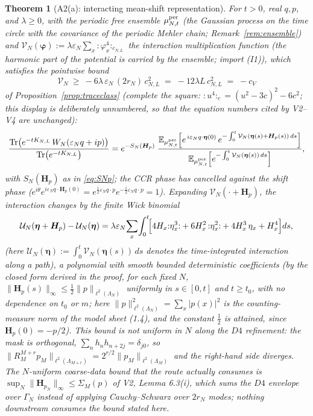 \documentclass[11pt,a4paper]{article}
\theoremstyle{plain}
\newtheorem{theorem}{Theorem}[section]
\theoremstyle{definition}
\newcommand{\E}{\mathbb{E}}
\newcommand{\eps}{\varepsilon}
\DeclareMathOperator{\Trace}{Tr}
\begin{document}
\begin{theorem}[A2(a): interacting mean-shift representation]\label{thm:meanshift}
For $t>0$, real $q,p$, and $\lambda\ge0$, with the periodic free ensemble
$\mu^{\rm per}_{N,t}$ (the Gaussian process on the time circle with the
covariance of the periodic Mehler chain; Remark~\ref{rem:ensemble}) and
$\mathcal V_N(\bm\varphi):=\lambda\eps_N\sum_x{:}\varphi_x^4{:}_{c_{N,L}}$
the \emph{interaction} multiplication function (the harmonic part of the
potential is carried by the ensemble; import (I1)), which satisfies the
pointwise bound
\[
 \mathcal V_N\ \ge\ -6\lambda\,\eps_N\,(2r_N)\,c_{N,L}^2
 \;=\;-12\lambda L\,c_{N,L}^2\;=\;-c_V
\]
of Proposition~\ref{prop:traceclass} (complete the square:
${:}u^4{:}_c=(u^2-3c)^2-6c^2$; this display is deliberately unnumbered, so
that the equation numbers cited by V2--V4 are unchanged):
\begin{equation}
 \frac{\Trace\bigl(e^{-tK_{N,L}}\,W_N(\eps_Nq+ip)\bigr)}
      {\Trace\bigl(e^{-tK_{N,L}}\bigr)}
 =e^{-S_N(\bm H_p)}\;
 \frac{\displaystyle\E_{\mu^{\rm per}_{N,t}}
 \Bigl[e^{\,i\eps_Nq\cdot\bm\eta(0)}\,
 e^{-\int_0^t\mathcal V_N(\bm\eta(s)+\bm H_p(s))\,ds}\Bigr]}
 {\displaystyle\E_{\mu^{\rm per}_{N,t}}
 \Bigl[e^{-\int_0^t\mathcal V_N(\bm\eta(s))\,ds}\Bigr]} ,
 \label{eq:meanshift}
\end{equation}
with $S_N(\bm H_p)$ as in \eqref{eq:SNp}; the CCR phase has cancelled against
the shift phase ($e^{i\theta}e^{i\eps_Nq\cdot\bm H_p(0)}
=e^{\frac i2\eps_Nq\cdot p}e^{-\frac i2\eps_Nq\cdot p}=1$). Expanding
$\mathcal V_N(\cdot+\bm H_p)$, the interaction changes by the finite Wick binomial
\begin{equation}
 \mathcal U_N(\bm\eta+\bm H_p)-\mathcal U_N(\bm\eta)
 =\lambda\eps_N\!\sum_x\!\int_0^t\!
 \Bigl[4H_x{:}\eta_x^3{:}+6H_x^2\,{:}\eta_x^2{:}
 +4H_x^3\,\eta_x+H_x^4\Bigr]ds,
 \label{eq:wickshift}
\end{equation}
(here $\mathcal U_N(\bm\eta):=\int_0^t\mathcal V_N(\bm\eta(s))\,ds$ denotes
the time-integrated interaction along a path), a polynomial with smooth
bounded deterministic coefficients
(by the closed form derived in the proof, for each fixed $N$,
$\|\bm H_p(s)\|_\infty\le\tfrac12\|p\|_{\ell^2(\Lambda_N)}$ uniformly in
$s\in[0,t]$ and $t\ge t_0$, with no dependence on $t_0$ or $m$; here
$\|p\|^2_{\ell^2(\Lambda_N)}=\sum_x|p(x)|^2$ is the counting-measure norm of the
model sheet (1.4), and the constant $\tfrac12$ is attained, since
$\bm H_p(0)=-p/2$).
This bound is \emph{not} uniform in $N$ along the $D4$ refinement: the mask is
orthogonal, $\sum_nh_nh_{n+2j}=\delta_{j0}$, so
$\|R_M^{M+r}p_M\|_{\ell^2(\Lambda_{M+r})}=2^{r/2}\|p_M\|_{\ell^2(\Lambda_M)}$ and
the right-hand side diverges. The $N$-uniform coarse-data bound that the route
actually consumes is $\sup_N\|\bm H_{p_N}\|_\infty\le\Sigma_M(p)$ of V2,
Lemma 6.3(i), which sums the $D4$ envelope over $\Gamma_N$ instead of applying
Cauchy--Schwarz over $2r_N$ modes; nothing downstream consumes the bound stated
here.
\end{theorem}
\end{document}
